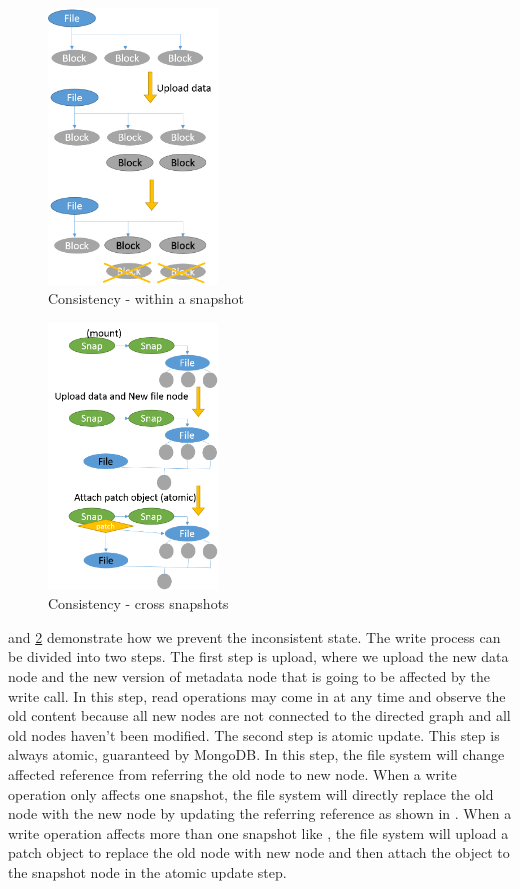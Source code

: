 \begin{figure}[t]
\centering
\includegraphics[width=0.4\textwidth]{Chapter-3/figs/fig27.png}
\caption{Consistency - within a snapshot}
\label{fig:consist1}
\end{figure}

\begin{figure}[t]
\centering
\includegraphics[width=0.4\textwidth]{Chapter-3/figs/fig28.png}
\caption{Consistency - cross snapshots}
\label{fig:consist2}
\end{figure}

     and \ref{fig:consist2} demonstrate how we prevent the inconsistent state. The write process can be divided into two steps. The first step is upload, where we upload the new data node and the new version of metadata node that is going to be affected by the write call. In this step, read operations may come in at any time and observe the old content because all new nodes are not connected to the directed graph and all old nodes haven't been modified. The second step is atomic update. This step is always atomic, guaranteed by MongoDB. In this step, the file system will change affected reference from referring the old node to new node. When a write operation only affects one snapshot, the file system will directly replace the old node with the new node by updating the referring reference as shown in . When a write operation affects more than one snapshot like , the file system will upload a patch object to replace the old node with new node and then attach the object to the snapshot node in the atomic update step.

